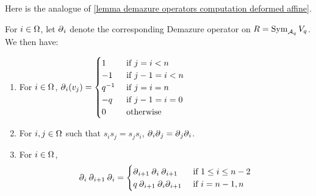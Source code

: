 Here is the analogue of \cref{lemma demazure operators computation deformed affine}.

\begin{lemma}\label{lemma q-demazure operators computation}
    For $i \in \Omega$, let $\ddq_i$ denote the corresponding Demazure operator on $R=\operatorname{Sym}_{\mathcal{A}_q}V_q$.     
We then have:
\begin{enumerate}
    \item For $i \in \Omega$, $\ddq_i(v_j)=\begin{cases}
        1 &\text{ if $j=i<n$}\\
        -1 &\text{ if $j-1=i<n$}\\
        q^{-1} &\text{ if $j=i=n$}\\
        -q &\text{ if $j-1=i=0$}\\
        0  &\text{ otherwise}
    \end{cases}$
    \item For $i,j \in \Omega$ such that $s_is_j=s_js_i$, $\ddq_i \ddq_j= \ddq_j \ddq_i$.
    \item For $i \in \Omega$, 
    $$\ddq_{i}\ddq_{i+1}\ddq_{i}=
    \begin{cases}
        \ddq_{i+1}\ddq_i\ddq_{i+1} &\text{ if $1\leq i \leq n-2$}\\
        q\ddq_{i+1}\ddq_i\ddq_{i+1} &\text{ if $i=n-1, n$}
    \end{cases}$$
    \end{enumerate}
\end{lemma}



